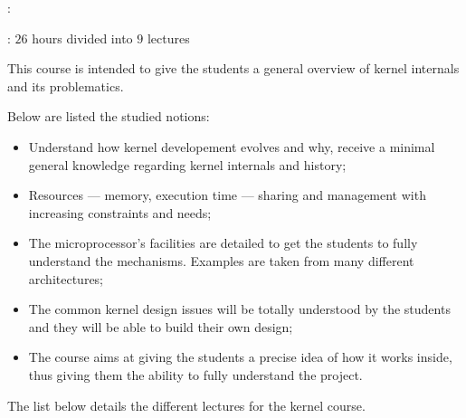 \begin{multicols}{2}

: 

: $26$ hours divided into $9$ lectures

This course is intended to give the students a general overview of
kernel internals and its problematics.

Below are listed the studied notions:

\begin{itemize}
  \item
    Understand how kernel developement evolves and why, receive a
    minimal general knowledge regarding kernel internals and history;
  \item
    Resources --- memory, execution time --- sharing and management with
    increasing constraints and needs;
  \item
    The microprocessor's facilities are detailed to get the students
    to fully understand the mechanisms. Examples are taken from
    many different architectures;
  \item
    The common kernel design issues will be totally understood by the
    students and they will be able to build their own design;
  \item
    The course aims at giving the students a precise idea of how it
    works inside, thus giving them the ability to fully understand
    the  project.
\end{itemize}

The list below details the different lectures for the kernel course.


\end{multicols}
